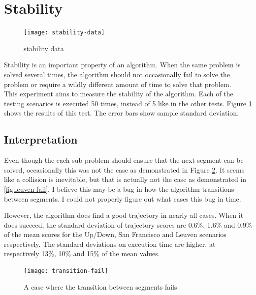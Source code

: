 \section{Stability}
\label{subsec:stability}
\begin{figure}[]
	\centering
	\texttt{[image: stability-data]}
	\caption{stability data}
	\label{fig:stability-data}
\end{figure}
Stability is an important property of an algorithm. When the same problem is solved several times, the algorithm should not occasionally fail to solve the problem or require a wildly different amount of time to solve that problem. \\
This experiment aims to measure the stability of the algorithm. Each of the testing scenarios is executed 50 times, instead of 5 like in the other tests. Figure \ref{fig:stability-data} shows the results of this test. The error bars show sample standard deviation. \\

\subsection{Interpretation}
Even though the each sub-problem should ensure that the next segment can be solved, occasionally this was not the case as demonstrated in Figure \ref{fig:transition-fail}. It seems like a collision is inevitable, but that is actually not the case as demonstrated in \ref{fig:leuven-fail}. I believe this may be a bug in how the algorithm transitions between segments. I could not properly figure out what cases this bug in time.
\par
However, the algorithm does find a good trajectory in nearly all cases. When it does succeed, the standard deviation of trajectory scores are 0.6\%, 1.6\% and 0.9\% of the mean scores for the Up/Down, San Francisco and Leuven scenarios respectively. The standard deviations on execution time are higher, at respectively 13\%, 10\% and 15\% of the mean values.
\begin{figure}[]
	\centering
	\texttt{[image: transition-fail]}
	\caption{A case where the transition between segments fails}
	\label{fig:transition-fail}
\end{figure}

